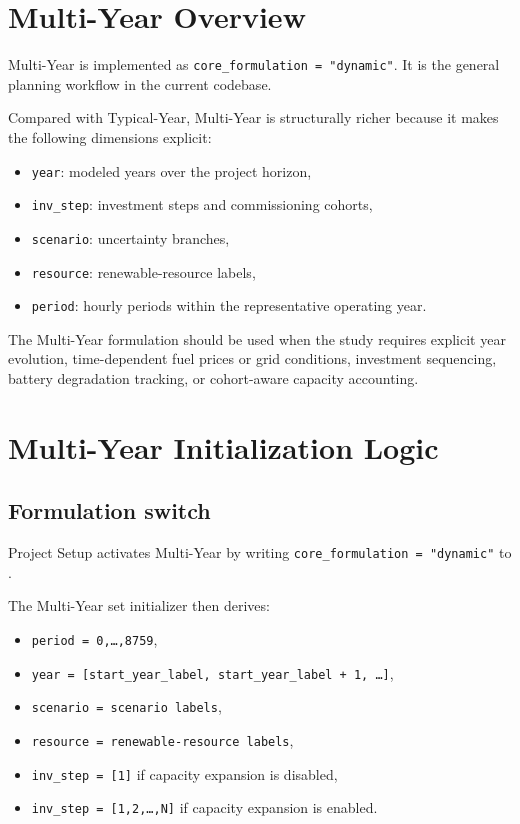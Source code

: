 \documentclass[11pt,a4paper]{report}
\newcommand{\code}[1]{\texttt{#1}}
\begin{document}
\chapter{Multi-Year Overview}\label{sec:multi-year-overview}

Multi-Year is implemented as \code{core\_formulation = "dynamic"}. It is the general planning workflow in the current codebase.

Compared with Typical-Year, Multi-Year is structurally richer because it makes the following dimensions explicit:

\begin{itemize}[leftmargin=1.5em]
  \item \code{year}: modeled years over the project horizon,
  \item \code{inv\_step}: investment steps and commissioning cohorts,
  \item \code{scenario}: uncertainty branches,
  \item \code{resource}: renewable-resource labels,
  \item \code{period}: hourly periods within the representative operating year.
\end{itemize}

The Multi-Year formulation should be used when the study requires explicit year evolution, time-dependent fuel prices or grid conditions, investment sequencing, battery degradation tracking, or cohort-aware capacity accounting.

\chapter{Multi-Year Initialization Logic}\label{sec:multi-year-init}

\section{Formulation switch}

Project Setup activates Multi-Year by writing
\code{core\_formulation = "dynamic"} to .

The Multi-Year set initializer then derives:

\begin{itemize}[leftmargin=1.5em]
  \item \code{period = 0,\dots,8759},
  \item \code{year = [start\_year\_label, start\_year\_label + 1, \dots]},
  \item \code{scenario = scenario labels},
  \item \code{resource = renewable-resource labels},
  \item \code{inv\_step = [1]} if capacity expansion is disabled,
  \item \code{inv\_step = [1,2,\dots,N]} if capacity expansion is enabled.
\end{itemize}
\end{document}
